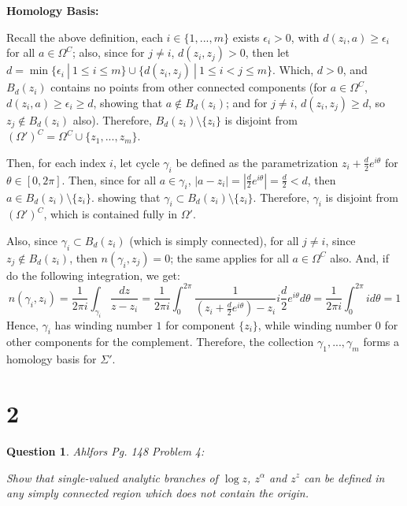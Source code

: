 \documentclass{article}
\newtheorem{question}{Question}
\begin{document}
\hfil

\textbf{Homology Basis:}

Recall the above definition, each $i\in \{1,...,m\}$ exists $\epsilon_i>0$, with $d(z_i,a)\geq \epsilon_i$ for all $a\in\Omega^C$;
also, since for $j\neq i$, $d(z_i,z_j)>0$, then let $d = \min\{\epsilon_i\ |\ 1\leq i\leq m\} \cup \{d(z_i,z_j)\ |\ 1\leq i<j\leq m\}$.
Which, $d>0$, and $B_d(z_i)$ contains no points from other connected components
(for $a\in \Omega^C$, $d(z_i,a)\geq \epsilon_i\geq d$, showing that $a\notin B_d(z_i)$; and for $j\neq i$, $d(z_i,z_j)\geq d$, so $z_j\notin B_d(z_i)$ also). Therefore, $B_d(z_i)\setminus\{z_i\}$ is disjoint from $(\Omega')^C = \Omega^C\cup \{z_1,...,z_m\}$.

Then, for each index $i$, let cycle $\gamma_i$ be defined as the parametrization $z_i+\frac{d}{2}e^{i\theta}$ for $\theta\in [0,2\pi]$. 
Then, since for all $a\in\gamma_i$, $|a-z_i| = |\frac{d}{2}e^{i\theta}| = \frac{d}{2}<d$, then $a\in B_d(z_i)\setminus\{z_i\}$. showing that $\gamma_i\subset B_d(z_i)\setminus\{z_i\}$.
Therefore, $\gamma_i$ is disjoint from $(\Omega')^C$, which is contained fully in $\Omega'$.

Also, since $\gamma_i\subset B_d(z_i)$ (which is simply connected), for all $j\neq i$, since $z_j\notin B_d(z_i)$, then $n(\gamma_i,z_j)=0$; the same applies for all $a\in \Omega^C$ also.
And, if do the following integration, we get:
$$n(\gamma_i,z_i)=\frac{1}{2\pi i}\int_{\gamma_i}\frac{dz}{z-z_i} = \frac{1}{2\pi i}\int_{0}^{2\pi}\frac{1}{(z_i+\frac{d}{2}e^{i\theta})-z_i}i\frac{d}{2}e^{i\theta}d\theta = \frac{1}{2\pi i}\int_{0}^{2\pi}id\theta = 1$$
Hence, $\gamma_i$ has winding number $1$ for component $\{z_i\}$, while winding number $0$ for other components for the complement. Therefore, the collection $\gamma_1,...,\gamma_m$ forms a homology basis for $\Sigma'$.

\hfil

\hfil

\section*{2}
\begin{myBox}[]{}
    \begin{question}
        Ahlfors Pg. 148 Problem 4:

        Show that single-valued analytic branches of $\log z$, $z^\alpha$ and $z^z$ can be
        defined in any simply connected region which does not contain the origin.
    \end{question}
\end{myBox}
\end{document}
